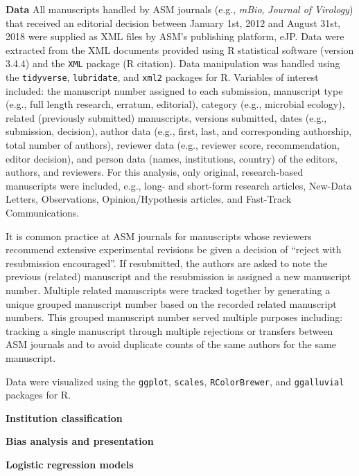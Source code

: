 \documentclass[11pt,]{article}
\begin{document}
\textbf{Data} All manuscripts handled by ASM journals (e.g.,
\emph{mBio}, \emph{Journal of Virology}) that received an editorial
decision between January 1st, 2012 and August 31st, 2018 were supplied
as XML files by ASM's publishing platform, eJP. Data were extracted from
the XML documents provided using R statistical software (version 3.4.4)
and the \texttt{XML} package (R citation). Data manipulation was handled
using the \texttt{tidyverse}, \texttt{lubridate}, and \texttt{xml2}
packages for R. Variables of interest included: the manuscript number
assigned to each submission, manuscript type (e.g., full length
research, erratum, editorial), category (e.g., microbial ecology),
related (previously submitted) manuscripts, versions submitted, dates
(e.g., submission, decision), author data (e.g., first, last, and
corresponding authorship, total number of authors), reviewer data (e.g.,
reviewer score, recommendation, editor decision), and person data
(names, institutions, country) of the editors, authors, and reviewers.
For this analysis, only original, research-based manuscripts were
included, e.g., long- and short-form research articles, New-Data
Letters, Observations, Opinion/Hypothesis articles, and Fast-Track
Communications.

It is common practice at ASM journals for manuscripts whose reviewers
recommend extensive experimental revisions be given a decision of
``reject with resubmission encouraged''. If resubmitted, the authors are
asked to note the previous (related) manuscript and the resubmission is
assigned a new manuscript number. Multiple related manuscripts were
tracked together by generating a unique grouped manuscript number based
on the recorded related manuscript numbers. This grouped manuscript
number served multiple purposes including: tracking a single manuscript
through multiple rejections or transfers between ASM journals and to
avoid duplicate counts of the same authors for the same manuscript.

Data were visualized using the \texttt{ggplot}, \texttt{scales},
\texttt{RColorBrewer}, and \texttt{ggalluvial} packages for R.

\textbf{Institution classification}

\textbf{Bias analysis and presentation}

\textbf{Logistic regression models}
\end{document}
